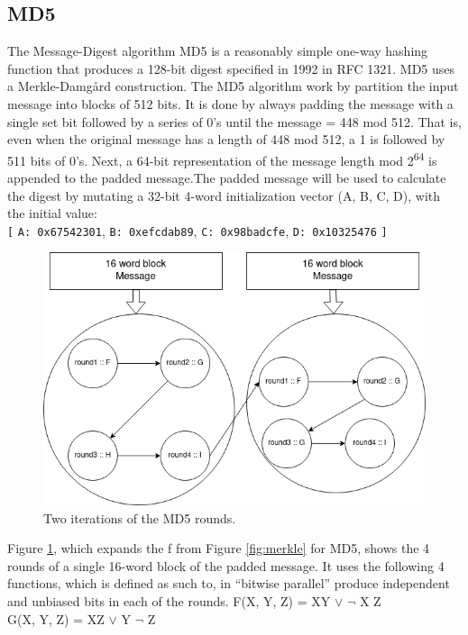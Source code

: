 \documentclass[a4paper]{article}
\begin{document}
\subsection{MD5}
\label{MD5alg}
The Message-Digest algorithm MD5 is a reasonably simple one-way hashing function that produces a 128-bit digest specified in 1992 in RFC 1321\cite{rfc1321}. MD5 uses a Merkle-Damgård construction.
The MD5 algorithm work by partition the input message into blocks of 512 bits. It is done by always padding the message with a single set bit followed by a series of 0's until the message = 448 mod 512. That is, even when the original message has a length of 448 mod 512, a 1 is followed by 511 bits of 0's.
Next, a 64-bit representation of the message length mod 2\textsuperscript{64} is appended to the padded message.The padded message will be used to calculate the digest by mutating a 32-bit 4-word initialization vector (A, B, C, D), with the initial value:\\
\texttt{[} \texttt{A: 0x67542301}, \texttt{B: 0xefcdab89}, \texttt{C: 0x98badcfe}, \texttt{D: 0x10325476} \texttt{]}\\
\begin{figure}[htbp]
\centering
\includegraphics[width=.9\linewidth]{./Background/MD5rounds.png}
\caption{\label{fig:MD5}Two iterations of the MD5 rounds.}
\end{figure}
Figure \ref{fig:MD5}, which expands the f from Figure \ref{fig:merkle} for MD5, shows the 4 rounds of a single 16-word block of the padded message.
It uses the following 4 functions, which is defined as such to, in ``bitwise parallel'' produce independent and unbiased bits in each of the rounds.
F(X, Y, Z) = XY \(\vee\) \(\neg{}\) X Z\\
G(X, Y, Z) = XZ \(\vee\) Y \(\neg{}\) Z\\
\end{document}
